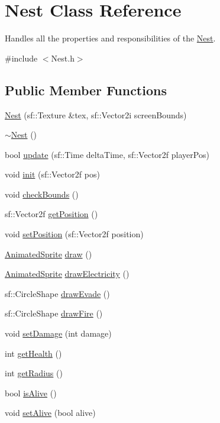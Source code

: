 \hypertarget{class_nest}{}\section{Nest Class Reference}
\label{class_nest}


Handles all the properties and responsibilities of the \hyperlink{class_nest}{Nest}.  




{\ttfamily \#include $<$Nest.\+h$>$}

\subsection*{Public Member Functions}
\begin{DoxyCompactItemize}
\item 
\hyperlink{class_nest_af88d2bfa6f9d0b0c48982ff54fe31cf9}{Nest} (sf\+::\+Texture \&tex, sf\+::\+Vector2i screen\+Bounds)
\item 
\hyperlink{class_nest_a3e879ba15acd31717b1dc9bdc87488d5}{$\sim$\+Nest} ()
\item 
bool \hyperlink{class_nest_a90efe6e30a891f7dd0620d4f14c3cef6}{update} (sf\+::\+Time delta\+Time, sf\+::\+Vector2f player\+Pos)
\item 
void \hyperlink{class_nest_a1b243050144c8b5200bd3e8a4370565a}{init} (sf\+::\+Vector2f pos)
\item 
void \hyperlink{class_nest_ad3c58a10bcb55df97a6d0e7923924f0b}{check\+Bounds} ()
\item 
sf\+::\+Vector2f \hyperlink{class_nest_a3904c58d1826997b98bdfd8b357ba6fa}{get\+Position} ()
\item 
void \hyperlink{class_nest_a483c559f957838c28d613fddad8b99f3}{set\+Position} (sf\+::\+Vector2f position)
\item 
\hyperlink{class_animated_sprite}{Animated\+Sprite} \hyperlink{class_nest_a6e4950498b1c767c513e1a5fac4259e5}{draw} ()
\item 
\hyperlink{class_animated_sprite}{Animated\+Sprite} \hyperlink{class_nest_ad90f39c39a435c3cb2702880b624d254}{draw\+Electricity} ()
\item 
sf\+::\+Circle\+Shape \hyperlink{class_nest_a69a224e6296dadbeee744697d308259c}{draw\+Evade} ()
\item 
sf\+::\+Circle\+Shape \hyperlink{class_nest_a3118b2257f6864632abf907c42af94fd}{draw\+Fire} ()
\item 
void \hyperlink{class_nest_a2a5904049fbb094af9f79ec55a5be9d6}{set\+Damage} (int damage)
\item 
int \hyperlink{class_nest_a31a181f820acdcc53c5c0954ec57bdd2}{get\+Health} ()
\item 
int \hyperlink{class_nest_a83653533eadad995b464a8a068257fe8}{get\+Radius} ()
\item 
bool \hyperlink{class_nest_a3f0d0175e349409ef2cab7e9bae0fb81}{is\+Alive} ()
\item 
void \hyperlink{class_nest_a122840333f4f0d0f5acd2815b0f633ca}{set\+Alive} (bool alive)
\end{DoxyCompactItemize}


